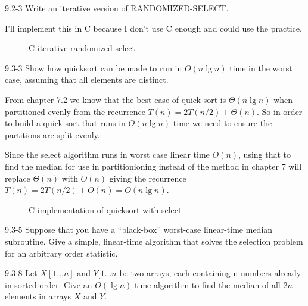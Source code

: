 

\usepackage{listings}




\homeworkheader{\classnameandsection}

\begin{problem}{9.2-3}
  Write an iterative version of RANDOMIZED-SELECT.
  \begin{solution}
    I'll implement this in C because I don't use C enough and could use the practice.
    \begin{figure}[H]
      \centering
      \caption{C iterative randomized select}
      
    \end{figure}
  \end{solution}
\end{problem}

\begin{problem}{9.3-3}
  Show how quicksort can be made to run in $O(n \lg n)$ time in the worst case, assuming that all elements are
  distinct.
  \begin{solution}
    From chapter 7.2 we know that the best-case of quick-sort is $\Theta(n \lg n)$ when partitioned evenly from the
    recurrence $T(n) = 2T(n/2) + \Theta(n)$. So in order to build a quick-sort that runs in $O(n \lg n)$ time we need to
    ensure the partitions are split evenly.

    Since the select algorithm runs in worst case linear time $O(n)$, using that to find the median for use in
    partitionioning instead of the method in chapter 7 will replace $\Theta(n)$ with $O(n)$ giving the recurrence $T(n)
    = 2T(n/2) + O(n) = O(n \lg n)$.
    \begin{figure}[H]
      \centering
      \caption{C implementation of quicksort with select}
      
    \end{figure}
  \end{solution}
\end{problem}

\begin{problem}{9.3-5}
  Suppose that you have a ``black-box'' worst-case linear-time median subroutine. Give a simple, linear-time algorithm
  that solves the selection problem for an arbitrary order statistic.
\end{problem}

\begin{problem}{9.3-8}
  Let $X[1\ldots n]$ and $Y[1\ldots n$ be two arrays, each containing n numbers already in sorted order. Give an $O(\lg
  n)$-time algorithm to find the median of all $2n$ elements in arrays $X$ and $Y$.
\end{problem}

